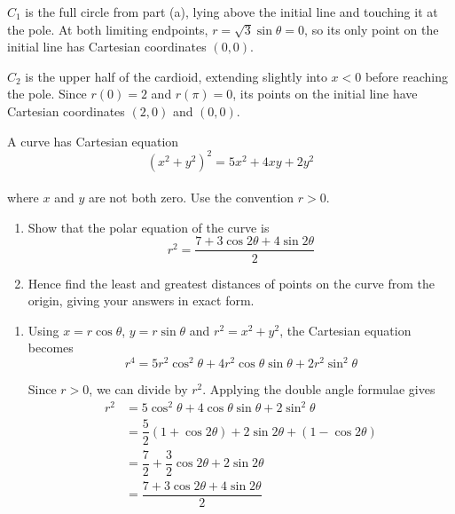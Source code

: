 \documentclass[leqno]{article}
\begin{document}
\begin{enumerate}[
  label=\textbf{\arabic*.},
  leftmargin=*,
  topsep=0pt,
  partopsep=0pt,
  parsep=0pt
]
\begin{djsSolution}
\begin{enumerate}[label=\textbf{(\alph*)}, start=1]
\(C_1\) is the full circle from part (a), lying above the initial line and touching it at the pole. At both limiting endpoints, \(r=\sqrt{3}\sin\theta=0\), so its only point on the initial line has Cartesian coordinates \((0,0)\).

\(C_2\) is the upper half of the cardioid, extending slightly into \(x<0\) before reaching the pole. Since \(r(0)=2\) and \(r(\pi)=0\), its points on the initial line have Cartesian coordinates \((2,0)\) and \((0,0)\).
\end{enumerate}
\end{djsSolution}

\newpage

\questionitem

A curve has Cartesian equation
\[
(x^2+y^2)^2=5x^2+4xy+2y^2
\] \\
where $x$ and $y$ are not both zero. Use the convention $r>0$. \\
\begin{enumerate}[label=\textbf{(\roman*)}]
\item Show that the polar equation of the curve is
\[
r^2=\frac{7+3\cos 2\theta+4\sin 2\theta}{2}
\] 
\item Hence find the least and greatest distances of points on the curve from the origin, giving your answers in exact form.  \\
\end{enumerate}

\vspace*{10pt}

\begin{djsSolution}
\begin{enumerate}[label=\textbf{(\roman*)}, start=1]
\item Using \(x=r\cos\theta\), \(y=r\sin\theta\) and \(r^2=x^2+y^2\), the Cartesian equation becomes
\[
r^4=5r^2\cos^2\theta+4r^2\cos\theta\sin\theta+2r^2\sin^2\theta
\]

Since \(r>0\), we can divide by \(r^2\). Applying the double angle formulae gives
\begin{align*}
r^2&=5\cos^2\theta+4\cos\theta\sin\theta+2\sin^2\theta\\
&=\dfrac{5}{2}(1+\cos2\theta)+2\sin2\theta+(1-\cos2\theta)\\
&=\dfrac{7}{2}+\dfrac{3}{2}\cos2\theta+2\sin2\theta\\
&=\dfrac{7+3\cos2\theta+4\sin2\theta}{2}
\end{align*}


\end{enumerate}
\end{djsSolution}
\end{enumerate}
\end{document}

